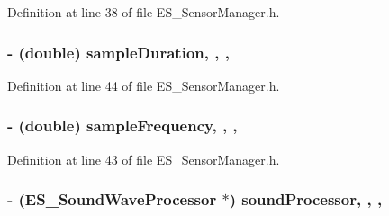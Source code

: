 Definition at line 38 of file E\+S\+\_\+\+Sensor\+Manager.\+h.

\hypertarget{interface_e_s___sensor_manager_ac711421753d85dfb05e239d4292d34f6}{
\subsubsection[{sample\+Duration}]{\setlength{\rightskip}{0pt plus 5cm}-\/ (double) sample\+Duration\hspace{0.3cm}{\ttfamily [read]}, {\ttfamily [write]}, {\ttfamily [nonatomic]}, {\ttfamily [assign]}}}\label{interface_e_s___sensor_manager_ac711421753d85dfb05e239d4292d34f6}


Definition at line 44 of file E\+S\+\_\+\+Sensor\+Manager.\+h.

\hypertarget{interface_e_s___sensor_manager_a4de937849fa5d7a7ae694be0942e9265}{
\subsubsection[{sample\+Frequency}]{\setlength{\rightskip}{0pt plus 5cm}-\/ (double) sample\+Frequency\hspace{0.3cm}{\ttfamily [read]}, {\ttfamily [write]}, {\ttfamily [nonatomic]}, {\ttfamily [assign]}}}\label{interface_e_s___sensor_manager_a4de937849fa5d7a7ae694be0942e9265}


Definition at line 43 of file E\+S\+\_\+\+Sensor\+Manager.\+h.

\hypertarget{interface_e_s___sensor_manager_a7cb9dfe9396c8b1b8d6124dd9fb1fce6}{
\subsubsection[{sound\+Processor}]{\setlength{\rightskip}{0pt plus 5cm}-\/ ({\bf E\+S\+\_\+\+Sound\+Wave\+Processor} $\ast$) sound\+Processor\hspace{0.3cm}{\ttfamily [read]}, {\ttfamily [write]}, {\ttfamily [nonatomic]}, {\ttfamily [strong]}}}\label{interface_e_s___sensor_manager_a7cb9dfe9396c8b1b8d6124dd9fb1fce6}


